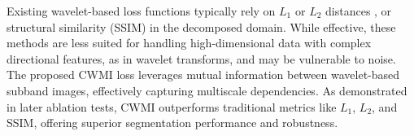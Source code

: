 Existing wavelet-based loss functions typically rely on $L_1$ \cite{zhu2021wavelet,korkmaz2024training,prantl2022wavelet} or $L_2$ distances \cite{kim2023whfl}, or structural similarity (SSIM) \cite{yang2020net} in the decomposed domain. While effective, these methods are less suited for handling high-dimensional data with complex directional features, as in wavelet transforms, and may be vulnerable to noise. The proposed CWMI loss leverages mutual information between wavelet-based subband images, effectively capturing multiscale dependencies. As demonstrated in later ablation tests, CWMI outperforms traditional metrics like $L_1$, $L_2$, and SSIM, offering superior segmentation performance and robustness.